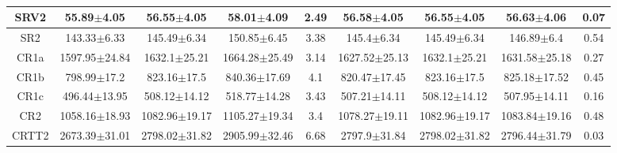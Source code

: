 \documentclass[12pt]{paper}
\begin{document}
\begin{table}[ht]
\begin{center}
{\begin{tabular}{c|ccc|c|ccc|c}
SRV2 & 55.89$\pm$4.05 & 56.55$\pm$4.05 & 58.01$\pm$4.09 & 2.49 & 56.58$\pm$4.05 & 56.55$\pm$4.05 & 56.63$\pm$4.06 & 0.07\\ 
\hline
SR2 & 143.33$\pm$6.33 & 145.49$\pm$6.34 & 150.85$\pm$6.45 & 3.38 & 145.4$\pm$6.34 & 145.49$\pm$6.34 & 146.89$\pm$6.4 & 0.54\\ 
\hline
\hline
CR1a & 1597.95$\pm$24.84 & 1632.1$\pm$25.21 & 1664.28$\pm$25.49 & 3.14 & 1627.52$\pm$25.13 & 1632.1$\pm$25.21 & 1631.58$\pm$25.18 & 0.27\\ 
CR1b & 798.99$\pm$17.2 & 823.16$\pm$17.5 & 840.36$\pm$17.69 & 4.1 & 820.47$\pm$17.45 & 823.16$\pm$17.5 & 825.18$\pm$17.52 & 0.45\\ 
CR1c & 496.44$\pm$13.95 & 508.12$\pm$14.12 & 518.77$\pm$14.28 & 3.43 & 507.21$\pm$14.11 & 508.12$\pm$14.12 & 507.95$\pm$14.11 & 0.16\\ 
CR2 & 1058.16$\pm$18.93 & 1082.96$\pm$19.17 & 1105.27$\pm$19.34 & 3.4 & 1078.27$\pm$19.11 & 1082.96$\pm$19.17 & 1083.84$\pm$19.16 & 0.48\\ 
CRTT2 & 2673.39$\pm$31.01 & 2798.02$\pm$31.82 & 2905.99$\pm$32.46 & 6.68 & 2797.9$\pm$31.84 & 2798.02$\pm$31.82 & 2796.44$\pm$31.79 & 0.03\\ 

\end{tabular}}
\end{center}\caption*{}\end{table}
\end{document}

